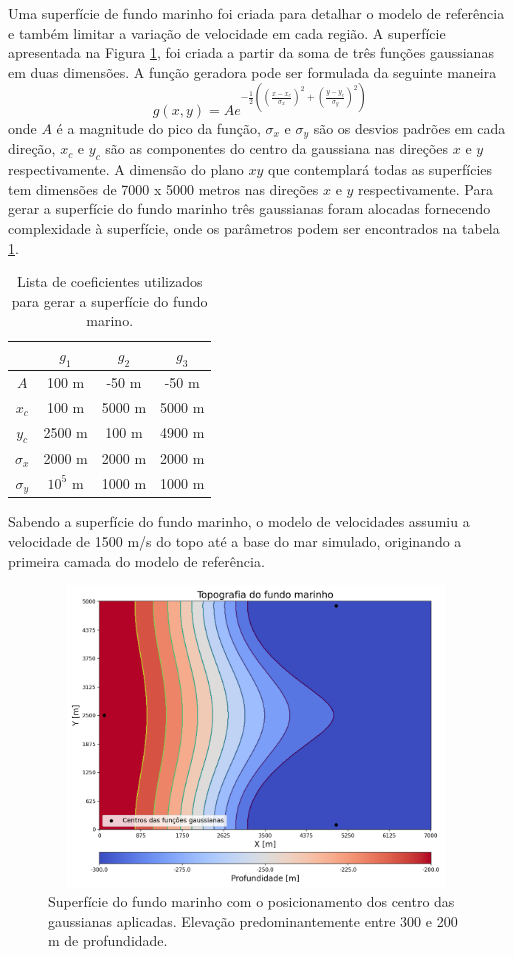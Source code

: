 Uma superfície de fundo marinho foi criada para detalhar o modelo de referência e também limitar a variação de velocidade em cada região. A superfície apresentada na Figura \ref{fig:water_bottom_surface_gaussian}, foi criada a partir da soma de três funções gaussianas em duas dimensões. A função geradora pode ser formulada da seguinte maneira
\begin{equation}
	g(x,y) = Ae^{-\frac{1}{2}\left( \left(\frac{x - x_c}{\sigma_x}\right)^2 + \left(\frac{y - y_c}{\sigma_y}\right)^2 \right)}   
	\label{gaussian_function}
\end{equation} 
\noindent onde $A$ é a magnitude do pico da função, $\sigma_x$ e $\sigma_y$ são os desvios padrões em cada direção, $x_c$ e $y_c$ são as componentes do centro da gaussiana nas direções $x$ e $y$ respectivamente. A dimensão do plano $xy$ que contemplará todas as superfícies tem dimensões de 7000 x 5000 metros nas direções $x$ e $y$ respectivamente. Para gerar a superfície do fundo marinho três gaussianas foram alocadas fornecendo complexidade à superfície, onde os parâmetros podem ser encontrados na tabela \ref{water_bottom_gaussian_coefs}.  
\begin{table}[H]
	\caption{Lista de coeficientes utilizados para gerar a superfície do fundo marino.}
	\begin{tabular}{c|ccc}
		& $g_1$    & $g_2$  & $g_3$ \\ \hline 
		$A$        & 100 m    & -50 m  & -50 m \\ \hline
		$x_c$      & 100 m    & 5000 m & 5000 m  \\ \hline
		$y_c$      & 2500 m   & 100 m  & 4900 m  \\ \hline
		$\sigma_x$ & 2000 m   & 2000 m & 2000 m  \\ \hline
		$\sigma_y$ & $10^5$ m & 1000 m & 1000 m
	\end{tabular}
	\label{water_bottom_gaussian_coefs}
\end{table}
\noindent Sabendo a superfície do fundo marinho, o modelo de velocidades assumiu a velocidade de 1500 m/s do topo até a base do mar simulado, originando a primeira camada do modelo de referência. 
\begin{figure}[H]
	\centering
	\includegraphics[width=11cm,height=8cm]{Imgs/Metodologia/water_bottom_surface_gaussian.png}
	\caption{Superfície do fundo marinho com o posicionamento dos centro das gaussianas aplicadas. Elevação predominantemente entre 300 e 200 m de profundidade.}
	\label{fig:water_bottom_surface_gaussian}	
\end{figure}

